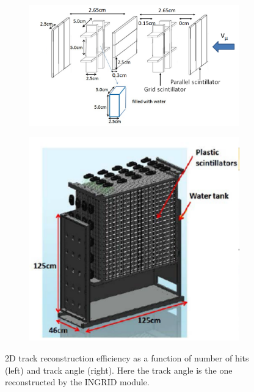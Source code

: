 \begin{figure}[tbhp]
  \begin{center}
   \begin{subfigure}{0.48\textwidth}
     \includegraphics[width=\linewidth]{fig/3d_grid_structure.pdf}
    \end{subfigure}
  \begin{subfigure}{0.48\textwidth}
      \includegraphics[width=\linewidth]{fig/wagasci_mod.pdf}
    \end{subfigure}    
    \end{center}
  \caption{2D track reconstruction efficiency as a function of number of hits (left) and track angle (right).
  Here the track angle is the one reconstructed by the INGRID module.}
\label{fig:wmefficiency}
\end{figure}


